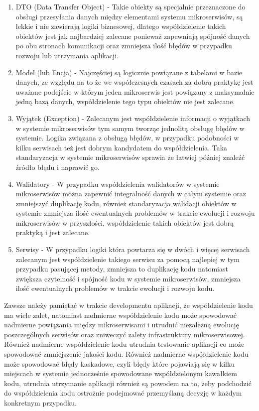 \documentclass[runningheads,12pt]{llncs} \usepackage{graphicx} \usepackage{todonotes} \usepackage{fancyhdr} \usepackage{lipsum} \usepackage[T1]{fontenc} \usepackage[provide=*,english,polish]{babel}
\begin{document}
\begin{enumerate} 
    \item DTO (Data Transfer Object) - Takie obiekty są specjalnie przeznaczone do obsługi przesyłania danych między elementami systemu mikroserwisów, są lekkie i nie zawierają logiki biznesowej, dlatego współdzielenie takich obiektów jest jak najbardziej zalecane ponieważ zapewniają spójność danych po obu stronach komunikacji oraz zmniejsza ilość błędów w przypadku rozwoju lub utrzymania aplikacji.
    \item Model (lub Encja) - Najczęściej są logicznie powiązane z tabelami w bazie danych, ze względu na to że we współczesnych czasach za dobrą praktykę jest uważane podejście w którym jeden mikroserwis jest powiązany z maksymalnie jedną bazą danych, współdzielenie tego typu obiektów nie jest zalecane.
    \item Wyjątek (Exception) - Zalecanym jest współdzielenie informacji o wyjątkach w systemie mikroserwisów tym samym tworząc jednolitą obsługę błędów w systemie. Logika związana z obsługą błędów, w przypadku podobności w kilku serwisach też jest dobrym kandydatem do współdzielenia. Taka standaryzacja w systemie mikroserwisów sprawia że łatwiej później znaleźć źródło błędu i naprawić go.
    \item Walidatory - W przypadku współdzielenia walidatorów w systemie mikroserwisów można zapewnić integralność danych w całym systemie oraz zmniejszyć duplikację kodu, również standaryzacja walidacji obiektów w systemie zmniejsza ilość ewentualnych problemów w trakcie ewolucji i rozwoju mikroserwisów w przyszłości, współdzielenie takich obiektów jest dobrą praktyką i jest zalecane.
    \item Serwisy - W przypadku logiki która powtarza się w dwóch i więcej serwisach zalecanym jest współdzielenie takiego serwisu za pomocą najlepiej w tym przypadku pasującej metody, zmniejsza to duplikację kodu natomiast zwiększa czytelność i spójność kodu w systemie mikroserwisów, zmniejsza ilość ewentualnych problemów w trakcie ewolucji i rozwoju kodu.
\end{enumerate}

Zawsze należy pamiętać w trakcie developmentu aplikacji, że współdzielenie kodu ma wiele zalet, natomiast nadmierne współdzielenie kodu może spowodować nadmierne powiązania między mikroserwisami i utrudnić niezależną ewolucję poszczególnych serwisów oraz zniweczyć zalety infrastruktury mikroserwisowej. Również nadmierne współdzielenie kodu utrudnia testowanie aplikacji co może spowodować zmniejszenie jakości kodu. Również nadmierne współdzielenie kodu może spowodować błędy kaskadowe, czyli błędy które pojawiają się w kilku miejscach w systemie jednocześnie spowodowane współdzielonym kawałkiem kodu, utrudnia utrzymanie aplikacji również są powodem na to, żeby podchodzić do współdzielenia kodu ostrożnie podejmować przemyślaną decyzję w każdym konkretnym przypadku.
\end{document}
